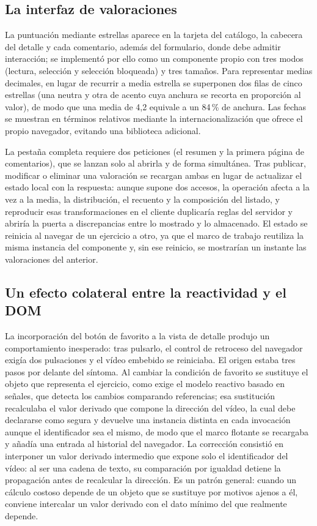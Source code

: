 \documentclass[12pt,a4paper,twoside,openright]{book}
\begin{document}
    \subsection{La interfaz de valoraciones}

    La puntuación mediante estrellas aparece en la tarjeta del catálogo, la
    cabecera del detalle y cada comentario, además del formulario, donde debe
    admitir interacción; se implementó por ello como un componente propio con tres
    modos (lectura, selección y selección bloqueada) y tres tamaños. Para
    representar medias decimales, en lugar de recurrir a media estrella se superponen
    dos filas de cinco estrellas (una neutra y otra de acento cuya anchura se recorta
    en proporción al valor), de modo que una media de 4,2
    equivale a un 84\,\% de anchura. Las fechas se muestran en términos relativos
    mediante la internacionalización que ofrece el propio navegador, evitando una
    biblioteca adicional.

    La pestaña completa requiere dos peticiones (el resumen y la primera página de comentarios),
    que se lanzan solo al abrirla y de forma simultánea. Tras
    publicar, modificar o eliminar una valoración se recargan ambas en lugar de
    actualizar el estado local con la respuesta: aunque supone dos accesos, la
    operación afecta a la vez a la media, la distribución, el recuento y la
    composición del listado, y reproducir esas transformaciones en el cliente
    duplicaría reglas del servidor y abriría la puerta a discrepancias entre lo
    mostrado y lo almacenado. El estado se reinicia al navegar de un ejercicio a
    otro, ya que el marco de trabajo reutiliza la misma instancia del componente
    y, sin ese reinicio, se mostrarían un instante las valoraciones del anterior.

    \subsection{Un efecto colateral entre la reactividad y el DOM}

    La incorporación del botón de favorito a la vista de detalle produjo un
    comportamiento inesperado: tras pulsarlo, el control de retroceso del navegador
    exigía dos pulsaciones y el vídeo embebido se reiniciaba. El origen estaba tres
    pasos por delante del síntoma. Al cambiar la condición de favorito se sustituye
    el objeto que representa el ejercicio, como exige el modelo reactivo basado en
    señales, que detecta los cambios comparando referencias; esa sustitución
    recalculaba el valor derivado que compone la dirección del vídeo, la cual debe
    declararse como segura y devuelve una instancia distinta en cada invocación
    aunque el identificador sea el mismo, de modo que el marco flotante se
    recargaba y añadía una entrada al historial del navegador. La corrección
    consistió en interponer un valor derivado intermedio que expone solo el
    identificador del vídeo: al ser una cadena de texto, su comparación por
    igualdad detiene la propagación antes de recalcular la dirección. Es un patrón
    general: cuando un cálculo costoso depende de un objeto que se sustituye por
    motivos ajenos a él, conviene intercalar un valor derivado con el dato mínimo
    del que realmente depende.
\end{document}
